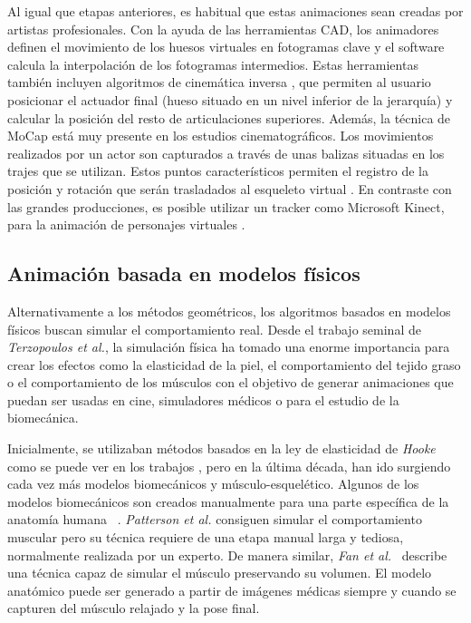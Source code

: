 Al igual que etapas anteriores, es habitual que estas animaciones sean creadas por artistas profesionales. Con la ayuda de las herramientas \ac{CAD}, los animadores definen el movimiento de los huesos virtuales en fotogramas clave y el software calcula la interpolación de los fotogramas intermedios. Estas herramientas también incluyen algoritmos de cinemática inversa \cite{Shi:2007}, que permiten al usuario posicionar el actuador final (hueso situado en un nivel inferior de la jerarquía) y calcular la posición del resto de articulaciones superiores. 
Además, la técnica de \ac{MoCap} está muy presente en los estudios cinematográficos. Los movimientos realizados por un actor son capturados a través de unas balizas situadas en los trajes que se utilizan. Estos puntos característicos permiten el registro de la posición y rotación que serán trasladados al esqueleto virtual \cite{Menache:1999}. En contraste con las grandes producciones, es posible utilizar un \ac{tracker} como Microsoft Kinect, para la animación de personajes virtuales \cite{Liu:2018}.


\subsection{Animación basada en modelos físicos}
\label{art:fisica}

Alternativamente a los métodos geométricos, los algoritmos basados en modelos físicos buscan simular el comportamiento real. Desde el trabajo seminal de \emph{Terzopoulos et al.}\cite{terzopoulos1987elastically}, la simulación física ha tomado una enorme importancia para crear los efectos como la elasticidad de la piel, el comportamiento del tejido graso o el comportamiento de los músculos con el objetivo de generar animaciones que puedan ser usadas en cine, simuladores médicos o para el estudio de la biomecánica. 

Inicialmente, se utilizaban métodos basados en la ley de elasticidad de \emph{Hooke} como se puede ver en los trabajos \cite{russell93,wilhelms1995modeling}, pero en la última década, han ido surgiendo cada vez más modelos biomecánicos y músculo-esquelético. Algunos de los modelos biomecánicos son creados manualmente para una parte específica de la anatomía humana ~\cite{Lee2009}. \emph{Patterson et al.} \cite{Patterson2012} consiguen simular el comportamiento muscular pero su técnica requiere de una etapa manual larga y tediosa, normalmente realizada por un experto. De manera similar, \emph{Fan et al.}~ \cite{Fan2014} describe una técnica capaz de simular el músculo preservando su volumen. El modelo anatómico puede ser generado a partir de imágenes médicas siempre y cuando se capturen del músculo relajado y la pose final. 


